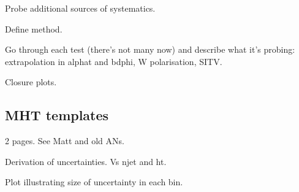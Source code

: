 Probe additional sources of systematics.

Define method.

Go through each test (there's not many now) and describe what it's probing: 
extrapolation in alphat and bdphi, W polarisation, SITV.

Closure plots.

\subsection{MHT templates}
2 pages. See Matt and old ANs.

Derivation of uncertainties. Vs njet and ht.

Plot illustrating size of uncertainty in each bin.
